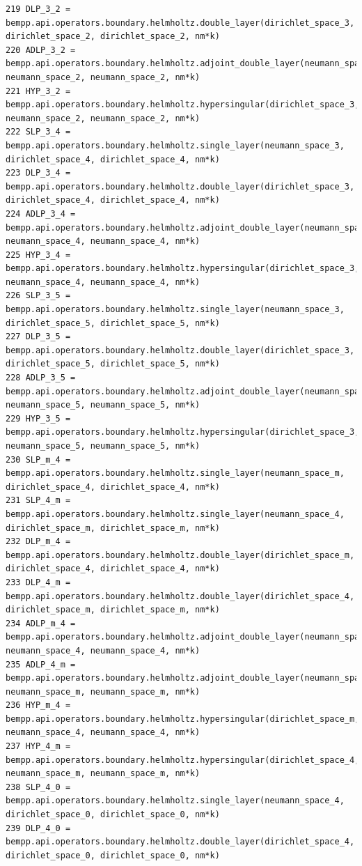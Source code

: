 \documentclass[12pt,letterpaper]{article}
\numberwithin{equation}{section}
\begin{document}
\begin{lstlisting}
219 DLP_3_2 = bempp.api.operators.boundary.helmholtz.double_layer(dirichlet_space_3, dirichlet_space_2, dirichlet_space_2, nm*k)
220 ADLP_3_2 = bempp.api.operators.boundary.helmholtz.adjoint_double_layer(neumann_space_3, neumann_space_2, neumann_space_2, nm*k)
221 HYP_3_2 = bempp.api.operators.boundary.helmholtz.hypersingular(dirichlet_space_3, neumann_space_2, neumann_space_2, nm*k)
222 SLP_3_4 = bempp.api.operators.boundary.helmholtz.single_layer(neumann_space_3, dirichlet_space_4, dirichlet_space_4, nm*k)
223 DLP_3_4 = bempp.api.operators.boundary.helmholtz.double_layer(dirichlet_space_3, dirichlet_space_4, dirichlet_space_4, nm*k)
224 ADLP_3_4 = bempp.api.operators.boundary.helmholtz.adjoint_double_layer(neumann_space_3, neumann_space_4, neumann_space_4, nm*k)
225 HYP_3_4 = bempp.api.operators.boundary.helmholtz.hypersingular(dirichlet_space_3, neumann_space_4, neumann_space_4, nm*k)
226 SLP_3_5 = bempp.api.operators.boundary.helmholtz.single_layer(neumann_space_3, dirichlet_space_5, dirichlet_space_5, nm*k)
227 DLP_3_5 = bempp.api.operators.boundary.helmholtz.double_layer(dirichlet_space_3, dirichlet_space_5, dirichlet_space_5, nm*k)
228 ADLP_3_5 = bempp.api.operators.boundary.helmholtz.adjoint_double_layer(neumann_space_3, neumann_space_5, neumann_space_5, nm*k)
229 HYP_3_5 = bempp.api.operators.boundary.helmholtz.hypersingular(dirichlet_space_3, neumann_space_5, neumann_space_5, nm*k)
230 SLP_m_4 = bempp.api.operators.boundary.helmholtz.single_layer(neumann_space_m, dirichlet_space_4, dirichlet_space_4, nm*k)
231 SLP_4_m = bempp.api.operators.boundary.helmholtz.single_layer(neumann_space_4, dirichlet_space_m, dirichlet_space_m, nm*k)
232 DLP_m_4 = bempp.api.operators.boundary.helmholtz.double_layer(dirichlet_space_m, dirichlet_space_4, dirichlet_space_4, nm*k)
233 DLP_4_m = bempp.api.operators.boundary.helmholtz.double_layer(dirichlet_space_4, dirichlet_space_m, dirichlet_space_m, nm*k)
234 ADLP_m_4 = bempp.api.operators.boundary.helmholtz.adjoint_double_layer(neumann_space_m, neumann_space_4, neumann_space_4, nm*k)
235 ADLP_4_m = bempp.api.operators.boundary.helmholtz.adjoint_double_layer(neumann_space_4, neumann_space_m, neumann_space_m, nm*k)
236 HYP_m_4 = bempp.api.operators.boundary.helmholtz.hypersingular(dirichlet_space_m, neumann_space_4, neumann_space_4, nm*k)
237 HYP_4_m = bempp.api.operators.boundary.helmholtz.hypersingular(dirichlet_space_4, neumann_space_m, neumann_space_m, nm*k)
238 SLP_4_0 = bempp.api.operators.boundary.helmholtz.single_layer(neumann_space_4, dirichlet_space_0, dirichlet_space_0, nm*k)
239 DLP_4_0 = bempp.api.operators.boundary.helmholtz.double_layer(dirichlet_space_4, dirichlet_space_0, dirichlet_space_0, nm*k)

\end{lstlisting}
\end{document}
